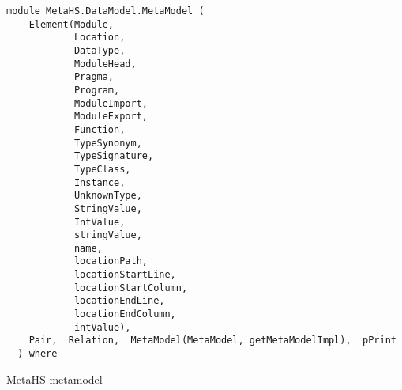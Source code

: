 \label{module:MetaHS.DataModel.MetaModel}
\haddockbeginheader
{\haddockverb\begin{verbatim}
module MetaHS.DataModel.MetaModel (
    Element(Module,
            Location,
            DataType,
            ModuleHead,
            Pragma,
            Program,
            ModuleImport,
            ModuleExport,
            Function,
            TypeSynonym,
            TypeSignature,
            TypeClass,
            Instance,
            UnknownType,
            StringValue,
            IntValue,
            stringValue,
            name,
            locationPath,
            locationStartLine,
            locationStartColumn,
            locationEndLine,
            locationEndColumn,
            intValue), 
    Pair,  Relation,  MetaModel(MetaModel, getMetaModelImpl),  pPrint
  ) where\end{verbatim}}
\haddockendheader

MetaHS metamodel\par

